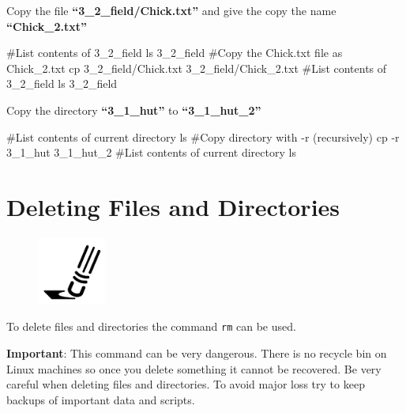\documentclass[
  letterpaper,
  DIV=11,
  numbers=noendperiod]{scrreprt}
\newenvironment{Shaded}{\begin{snugshade}}{\end{snugshade}}
\newcommand{\AttributeTok}[1]{\textcolor[rgb]{0.40,0.45,0.13}{#1}}
\newcommand{\CommentTok}[1]{\textcolor[rgb]{0.37,0.37,0.37}{#1}}
\newcommand{\FunctionTok}[1]{\textcolor[rgb]{0.28,0.35,0.67}{#1}}
\newcommand{\NormalTok}[1]{\textcolor[rgb]{0.00,0.23,0.31}{#1}}
\begin{document}
Copy the file \textbf{``3\_2\_field/Chick.txt''} and give the copy the
name \textbf{``Chick\_2.txt''}

\begin{Shaded}
\begin{Highlighting}[]
\CommentTok{\#List contents of 3\_2\_field}
\FunctionTok{ls}\NormalTok{ 3\_2\_field}
\CommentTok{\#Copy the Chick.txt file as Chick\_2.txt}
\FunctionTok{cp}\NormalTok{ 3\_2\_field/Chick.txt 3\_2\_field/Chick\_2.txt}
\CommentTok{\#List contents of 3\_2\_field}
\FunctionTok{ls}\NormalTok{ 3\_2\_field}
\end{Highlighting}
\end{Shaded}

Copy the directory \textbf{``3\_1\_hut''} to \textbf{``3\_1\_hut\_2''}

\begin{Shaded}
\begin{Highlighting}[]
\CommentTok{\#List contents of current directory}
\FunctionTok{ls}
\CommentTok{\#Copy directory with {-}r (recursively)}
\FunctionTok{cp} \AttributeTok{{-}r}\NormalTok{ 3\_1\_hut 3\_1\_hut\_2}
\CommentTok{\#List contents of current directory}
\FunctionTok{ls}
\end{Highlighting}
\end{Shaded}

\hypertarget{deleting-files-and-directories}{%
\section{Deleting Files and
Directories}\label{deleting-files-and-directories}}

\begin{figure}

{\centering \includegraphics[width=0.2\textwidth,height=\textheight]{figures/erase.png}

}

\end{figure}

To delete files and directories the command \texttt{rm} can be used.

\textbf{Important}: This command can be very dangerous. There is no
recycle bin on Linux machines so once you delete something it cannot be
recovered. Be very careful when deleting files and directories. To avoid
major loss try to keep backups of important data and scripts.
\end{document}
